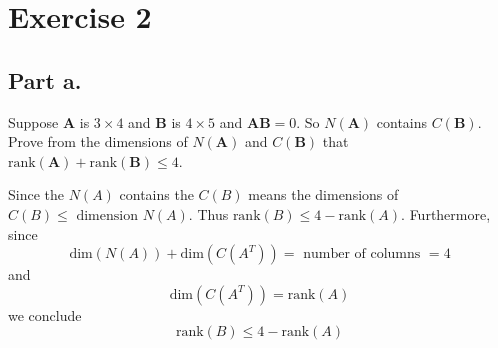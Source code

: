 \newcommand{\matA}{\mathbf{A}}
\newcommand{\matB}{\mathbf{B}}
\section{Exercise 2}
\subsection{Part a.}
Suppose $\mathbf{A}$ is $3 \times 4$ and $\mathbf{B}$ is $4 \times 5$ and
$\matA \matB =0$. So $N(\matA)$ contains $C(\matB)$. Prove from the
dimensions of $N(\matA)$ and $C(\matB)$ that $\text{rank}(\matA) +
\text{rank}(\matB) \leq 4$. 

\begin{mdframed}[style=MyFrame]
    Since the $N(A)$ contains the $C(B)$ means the dimensions of $C(B) \leq
    \text{ dimension } N(A)$. Thus $\text{rank}(B) \leq 4 - \text{
        rank}(A)$. Furthermore, since 
    \begin{equation}
        \text{dim}(N(A)) + \text{dim}(C(A^{T})) = 
                \text{ number of columns } = 4
    \end{equation}
    and 
    \begin{equation}
        \text{dim}(C(A^{T})) = \text{rank}(A)
    \end{equation}
    we conclude
    \begin{equation}
        \text{rank}(B) \leq 4-\text{rank}(A)
    \end{equation}
\end{mdframed}

